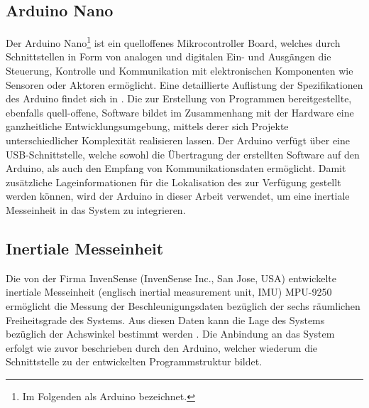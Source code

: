 \subsection{Arduino\textsuperscript{\texttrademark} Nano}
\label{chap.arduino}
Der Arduino\textsuperscript{\texttrademark} Nano\footnote{Im Folgenden als Arduino bezeichnet.} ist ein quelloffenes Mikrocontroller Board, welches durch Schnittstellen in Form von analogen und digitalen Ein- und Ausgängen die Steuerung, Kontrolle und Kommunikation mit elektronischen Komponenten wie Sensoren oder Aktoren ermöglicht. Eine detaillierte Auflistung der Spezifikationen des Arduino findet sich in . Die zur Erstellung von Programmen bereitgestellte, ebenfalls quell-offene, Software bildet im Zusammenhang mit der Hardware eine ganzheitliche Entwicklungsumgebung, mittels derer sich Projekte unterschiedlicher Komplexität realisieren lassen. Der Arduino verfügt über eine USB-Schnittstelle, welche sowohl die Übertragung der erstellten Software auf den Arduino, als auch den Empfang von Kommunikationsdaten ermöglicht. Damit zusätzliche Lageinformationen für die Lokalisation des  zur Verfügung gestellt werden können, wird der Arduino in dieser Arbeit verwendet, um eine inertiale Messeinheit in das System zu integrieren.

\prever{
}


\subsection{Inertiale Messeinheit}
\label{chap.imu}
Die von der Firma InvenSense (InvenSense Inc., San Jose, USA) entwickelte inertiale Messeinheit (englisch inertial measurement unit, IMU) MPU-9250 ermöglicht die Messung der Beschleunigungsdaten bezüglich der sechs räumlichen Freiheitsgrade des Systems. Aus diesen Daten kann die Lage des Systems bezüglich der Achswinkel bestimmt werden \cite{IMU}. Die Anbindung an das System erfolgt wie zuvor beschrieben durch den Arduino, welcher wiederum die Schnittstelle zu der entwickelten Programmstruktur bildet.
\prever{
}


